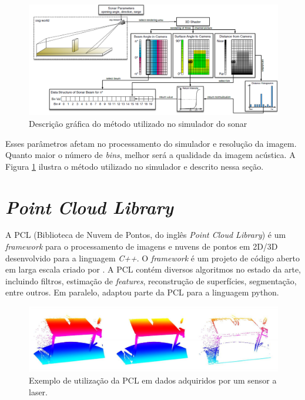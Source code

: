 \begin{figure}[H]
    \centering
    \caption{Descrição gráfica do método utilizado no simulador do sonar}
    \label{fig:gpu_sonar_sim}
    \includegraphics[scale=0.35]{dados/figuras/gpu_sonar.png}
\end{figure}

Esses parâmetros afetam no processamento do simulador e resolução da imagem. Quanto maior o número de \textit{bins}, melhor será a qualidade da imagem acústica. A Figura \ref{fig:gpu_sonar_sim} ilustra o método utilizado no simulador e descrito nessa seção.

\section{\textit{Point Cloud Library}}
\label{sec:pcl}

A PCL (Biblioteca de Nuvem de Pontos, do inglês \textit{Point Cloud Library}) é um \textit{framework} para o processamento de imagens e nuvens de pontos em 2D/3D desenvolvido para a linguagem \textit{C++}. 
O \textit{framework} é um projeto de código aberto em larga escala criado por \cite{rusu2011pcl}. 
A PCL contém diversos algoritmos no estado da arte, incluindo filtros, estimação de \textit{features}, reconstrução de superfícies, segmentação, entre outros. 
Em paralelo, \cite{strawlab2012} adaptou parte da PCL para a linguagem python. 

\begin{figure}[H]
    \centering
    \caption{Exemplo de utilização da PCL em dados adquiridos por um sensor a laser.}
    \label{fig:pcl_example}
    \includegraphics[scale=0.3]{dados/figuras/pcl_example.png}
\end{figure}

